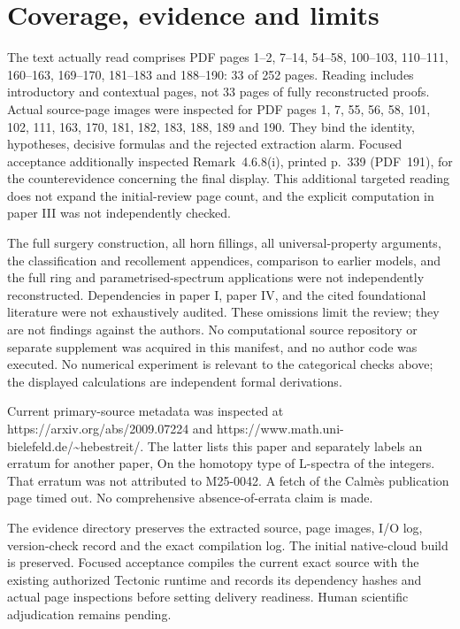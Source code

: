 \documentclass[10pt]{article}
\begin{document}
\section*{Coverage, evidence and limits}
The text actually read comprises PDF pages 1–2, 7–14, 54–58, 100–103, 110–111, 160–163, 169–170, 181–183 and 188–190: 33 of 252 pages. Reading includes introductory and contextual pages, not 33 pages of fully reconstructed proofs. Actual source-page images were inspected for PDF pages 1, 7, 55, 56, 58, 101, 102, 111, 163, 170, 181, 182, 183, 188, 189 and 190. They bind the identity, hypotheses, decisive formulas and the rejected extraction alarm. Focused acceptance additionally inspected Remark 4.6.8(i), printed p. 339 (PDF 191), for the counterevidence concerning the final display. This additional targeted reading does not expand the initial-review page count, and the explicit computation in paper III was not independently checked.\par
The full surgery construction, all horn fillings, all universal-property arguments, the classification and recollement appendices, comparison to earlier models, and the full ring and parametrised-spectrum applications were not independently reconstructed. Dependencies in paper I, paper IV, and the cited foundational literature were not exhaustively audited. These omissions limit the review; they are not findings against the authors. No computational source repository or separate supplement was acquired in this manifest, and no author code was executed. No numerical experiment is relevant to the categorical checks above; the displayed calculations are independent formal derivations.\par
Current primary-source metadata was inspected at https://arxiv.org/abs/2009.07224 and https://www.math.uni-bielefeld.de/\textasciitilde{}hebestreit/. The latter lists this paper and separately labels an erratum for another paper, On the homotopy type of L-spectra of the integers. That erratum was not attributed to M25-0042. A fetch of the Calmès publication page timed out. No comprehensive absence-of-errata claim is made.\par
The evidence directory preserves the extracted source, page images, I/O log, version-check record and the exact compilation log. The initial native-cloud build is preserved. Focused acceptance compiles the current exact source with the existing authorized Tectonic runtime and records its dependency hashes and actual page inspections before setting delivery readiness. Human scientific adjudication remains pending.\par
\end{document}

